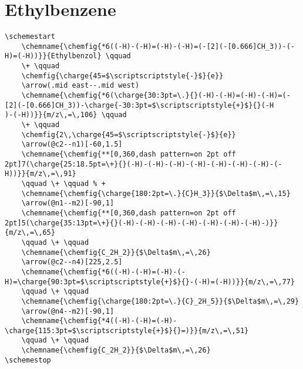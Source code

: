 \section{Ethylbenzene}\label{app:ethylbenzene}
\begin{lstlisting}
\schemestart
    \chemname{\chemfig{*6((-H)-(-H)=(-H)-(-H)=(-[2](-[0.666]CH_3))-(-H)=(-H))}}{Ethylbenzol} \qquad
    \+ \qquad
    \chemfig{\charge{45=$\scriptscriptstyle{-}$}{e}}
    \arrow(.mid east--.mid west)
    \chemname{\chemfig{*6(\charge{30:3pt=\.}{}(-H)-(-H)=(-H)-(-H)=(-[2](-[0.666]CH_3))-\charge{-30:3pt=$\scriptscriptstyle{+}$}{}(-H
)-(-H))}}{m/z\,=\,106} \qquad
    \+ \qquad
    \chemfig{2\,\charge{45=$\scriptscriptstyle{-}$}{e}}
    \arrow(@c2--n1)[-60,1.5]
    \chemname{\chemfig{**[0,360,dash pattern=on 2pt off 2pt]7(\charge{25:18.5pt=\+}{}(-H)-(-H)-(-H)-(-H)-(-H)-(-H)-(-H)-(-H))}}{m/z\,=\,91}
    \qquad \+ \qquad % +
    \chemname{\chemfig{\charge{180:2pt=\.}{C}H_3}}{$\Delta$m\,=\,15}
    \arrow(@n1--m2)[-90,1]
    \chemname{\chemfig{**[0,360,dash pattern=on 2pt off 2pt]5(\charge{35:13pt=\+}{}(-H)-(-H)-(-H)-(-H)-(-H)-(-H)-(-H)-)}}{m/z\,=\,65}
    \qquad \+ \qquad
    \chemname{\chemfig{C_2H_2}}{$\Delta$m\,=\,26}
    \arrow(@c2--n4)[225,2.5]
    \chemname{\chemfig{*6((-H)-(-H)=(-H)-(-H)=\charge{90:3pt=$\scriptscriptstyle{+}$}{}-(-H)=(-H))}}{m/z\,=\,77}
    \qquad \+ \qquad
    \chemname{\chemfig{\charge{180:2pt=\.}{C}_2H_5}}{$\Delta$m\,=\,29}
    \arrow(@n4--m2)[-90,1]
    \chemname{\chemfig{*4((-H)-(-H)=(-H)-\charge{115:3pt=$\scriptscriptstyle{+}$}{}=)}}{m/z\,=\,51}
    \qquad \+ \qquad
    \chemname{\chemfig{C_2H_2}}{$\Delta$m\,=\,26}
\schemestop
\end{lstlisting}



